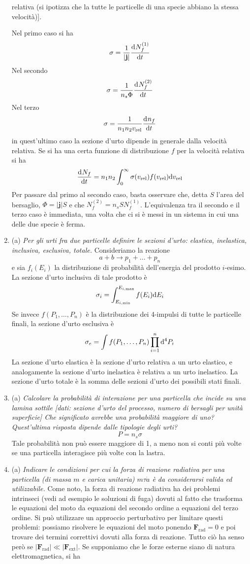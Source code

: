 \documentclass{article}
\renewcommand{\a}{(a)}
\renewcommand{\t}[1]{\textit{ #1}}
\renewcommand{\vec}[1]{\mathbf{#1}}
\begin{document}
\begin{enumerate}
{\begin{itemize}
		relativa (si ipotizza che la tutte le particelle di una specie abbiano la stessa
		velocità)].
	\end{itemize}}Nel primo caso si ha
\[\sigma=\frac{1}{|\vec{j}|}\der{N^{(1)}_f}{t}\]
Nel secondo
\[\sigma=\frac{1}{n_s\Phi}\dfrac{\mathrm{d} ^{}N^{(2)}_f}{\mathrm{d} {t}^{}}\]
Nel terzo
\[\sigma=\frac{1}{n_1n_2v_\textrm{rel}}\dfrac{\mathrm{d} ^{}n_f}{\mathrm{d} {t}^{}}\]
in quest'ultimo caso la sezione d'urto dipende in generale dalla velocità relativa. Se si ha una certa funzione di distribuzione $f$ per la velocità relativa si ha 
\[\dfrac{\mathrm{d} ^{}N_f}{\mathrm{d} {t}^{}}=n_1n_2\int_{0}^{\infty}\sigma(v_\textrm{rel})f(v_\textrm{rel})\mathrm{d} v_\textrm{rel}\]Per passare dal primo al secondo caso, basta osservare che, detta $S$ l'area del bersaglio, $\Phi=|\vec{j}|S$ e che $N^{(2)}_f=n_s SN^{(1)}_f$. L'equivalenza tra il secondo e il terzo caso è immediata, una volta che ci si è messi in un sistema in cui una delle due specie è ferma.
	\item\a\t{Per gli urti fra due particelle definire le sezioni d'urto: elastica, inelastica,
		inclusiva, esclusiva, totale.} Consideriamo la reazione
	\[a+b\to p_1+\dots+p_n\]
	e sia $f_i(E_i)$ la distribuzione di probabilità dell'energia del prodotto $i$-esimo. La sezione d'urto inclusiva di tale prodotto è
	\[\sigma_i=\int_{E_{i,\textrm{min}}}^{E_{i,\textrm{max}}}f(E_i)\mathrm{d} E_i\]
	Se invece $f(P_1,\dots,P_n)$ è la distribuzione dei 4-impulsi di tutte le particelle finali, la sezione d'urto esclusiva è
	\[\sigma_e=\int f(P_1,\dots,P_n)\prod_{i=1}^{n}\mathrm{d} ^4P_i\]
	La sezione d'urto elastica è la sezione d'urto relativa a un urto elastico, e analogamente la sezione d'urto inelastica è relativa a un urto inelastico.	La sezione d'urto totale è la somma delle sezioni d'urto dei possibili stati finali.
	\item\a\t{Calcolare la probabilità di interazione per una particella che incide su una lamina
		sottile [dati: sezione d'urto del processo, numero di bersagli per unità superficie]
		Che significato avrebbe una probabilità maggiore di uno? Quest'ultima risposta
		dipende dalle tipologie degli urti?}
	\[P=n_s\sigma\]
	Tale probabilità non può essere maggiore di 1, a meno non si conti più volte se una particella interagisce più volte con la lastra.
	\item\a\t{Indicare le condizioni per cui la forza di reazione radiativa per una particella (di
		massa $m$ e carica unitaria) $m\tau\dot{a}$ è da considerarsi valida ed utilizzabile.} Come noto, la forza di reazione radiativa ha dei problemi intrinseci (vedi ad esempio le soluzioni di fuga) dovuti al fatto che trasforma le equazioni del moto da equazioni del secondo ordine a equazioni del terzo ordine. Si può utilizzare un approccio perturbativo per limitare questi problemi: possiamo risolvere le equazioni del moto ponendo $\vec{F}_\textrm{rad}=0$ e poi trovare dei termini correttivi dovuti alla forza di reazione. Tutto ciò ha senso però se $|\vec{F}_\textrm{rad}|\ll|\vec{F}_\textrm{ext}|$. Se supponiamo che le forze esterne siano di natura elettromagnetica, si ha

\end{enumerate}
\end{document}
